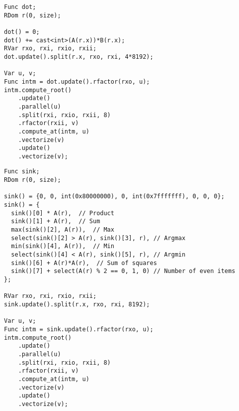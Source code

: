 \begin{lstlisting}[caption={Benchmark code for dot product}, label={lst:benchmark_dot_product}]
Func dot;
RDom r(0, size);

dot() = 0;
dot() += cast<int>(A(r.x))*B(r.x);
RVar rxo, rxi, rxio, rxii;
dot.update().split(r.x, rxo, rxi, 4*8192);

Var u, v;
Func intm = dot.update().rfactor(rxo, u);
intm.compute_root()
    .update()
    .parallel(u)
    .split(rxi, rxio, rxii, 8)
    .rfactor(rxii, v)
    .compute_at(intm, u)
    .vectorize(v)
    .update()
    .vectorize(v);
\end{lstlisting}

\begin{lstlisting}[caption={Benchmark code for kitchen sink.}, label={lst:benchmark_kitchen_sink}]
Func sink;
RDom r(0, size);

sink() = {0, 0, int(0x80000000), 0, int(0x7fffffff), 0, 0, 0};
sink() = {
  sink()[0] * A(r),  // Product
  sink()[1] + A(r),  // Sum
  max(sink()[2], A(r)),  // Max
  select(sink()[2] > A(r), sink()[3], r), // Argmax
  min(sink()[4], A(r)),  // Min
  select(sink()[4] < A(r), sink()[5], r), // Argmin
  sink()[6] + A(r)*A(r),  // Sum of squares
  sink()[7] + select(A(r) % 2 == 0, 1, 0) // Number of even items
};

RVar rxo, rxi, rxio, rxii;
sink.update().split(r.x, rxo, rxi, 8192);

Var u, v;
Func intm = sink.update().rfactor(rxo, u);
intm.compute_root()
    .update()
    .parallel(u)
    .split(rxi, rxio, rxii, 8)
    .rfactor(rxii, v)
    .compute_at(intm, u)
    .vectorize(v)
    .update()
    .vectorize(v);
\end{lstlisting}
